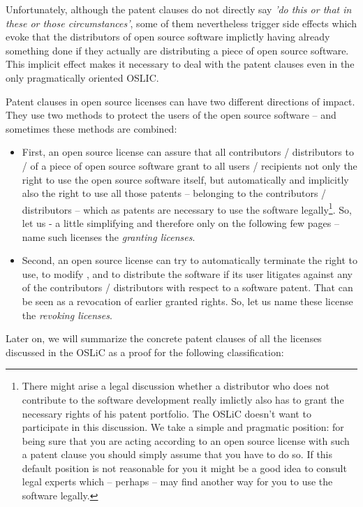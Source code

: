 Unfortunately, although the patent clauses do not directly say \emph{'do this or
that in these or those circumstances'}, some of them nevertheless trigger side
effects which evoke that the distributors of open source software implictly
having already something done if they actually are distributing a piece of open
source software. This implicit effect makes it necessary to deal with the patent
clauses even in the only pragmatically oriented OSLIC.

Patent clauses in open source licenses can have two different directions of
impact. They use two methods to protect the users of the open source software --
and sometimes these methods are combined:

\begin{itemize}
  \item First, an open source license can assure that all contributors /
  distributors to / of a piece of open source software grant to all users /
  recipients not only the right to use the open source software itself, but
  automatically and implicitly also the right to use all those patents --
  belonging to the contributors / distributors -- which as patents are necessary
  to use the software legally\footnote{There might arise a legal discussion
  whether a distributor who does not contribute to the software development
  really imlictly also has to grant the necessary rights of his patent
  portfolio. The OSLiC doesn't want to participate in this discussion. We take a
  simple and pragmatic position: for being sure that you are acting according to
  an open source license with such a patent clause you should simply assume that
  you have to do so. If this default position is not reasonable for you it might
  be a good idea to consult legal experts which -- perhaps -- may find another
  way for you to use the software legally.}. So, let us - a little simplifying
  and therefore only on the following few pages -- name such licenses the
  \emph{granting licenses}.
  \item Second, an open source license can try to automatically terminate the
  right to use, to modify , and to distribute the software if its user litigates
  against any of the contributors / distributors with respect to a software
  patent. That can be seen as a revocation of earlier granted rights. So, let us
  name these license the \emph{revoking licenses}.
\end{itemize}

Later on, we will summarize the concrete patent clauses of all the licenses
discussed in the OSLiC as a proof for the following classification:


